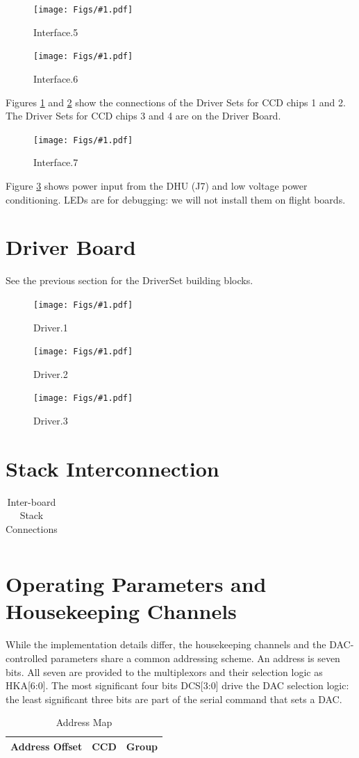 \documentclass[12pt]{article}
\let\oldsection\section
\renewcommand{\section}{\FloatBarrier\oldsection}
\newcommand{\schempage}[1]{
   \begin{center}
\begin{figure}[ht!]
   \centerline{\texttt{[image: Figs/\#1.pdf]}}
    \caption{#1}
    \label{#1}
    \end{figure}
\end{center}
}
\begin{document}
\schempage{Interface.5}
\schempage{Interface.6}
Figures \ref{Interface.5} and \ref{Interface.6} show the connections of the Driver Sets for CCD chips 1 and 2. The Driver Sets for CCD chips 3 and 4 are on the Driver Board.
\FloatBarrier
\schempage{Interface.7}
\FloatBarrier
Figure \ref{Interface.7} shows power input from the DHU (J7) and low voltage power conditioning. LEDs are for debugging: we will not install them on flight boards.

\section{Driver Board}
\label{Driver}
See the previous section for the DriverSet building blocks.
\schempage{Driver.1}
\schempage{Driver.2}
\schempage{Driver.3}

\section{Stack Interconnection}

\tiny{
    \begin{longtable}{|m{}|m{}|m{}|m{}|m{}|m{}|m{}|m{}|@{}m{0pt}@{}}
    \caption{Inter-board Stack Connections} \label{Stack} \\
    \hline
    
    \end{longtable}
}

\normalsize

\section{Operating Parameters and Housekeeping Channels}
\label{param}

While the implementation details differ, the housekeeping channels and the DAC-controlled parameters share a common addressing scheme. An address is seven bits. All seven are provided to the multiplexors and their selection logic as HKA[6:0]. The most significant four bits DCS[3:0] drive the DAC selection logic: the least significant three bits are part of the serial command that sets a DAC. 

\begin{table}[ht!]
\caption{Address Map}
\begin{center}
\begin{tabular}{|l|l|l|}
\hline
Address Offset & CCD & Group \\
\hline

\hline
\end{tabular}
\end{center}
\vspace{5pt}

\label{hkmap}
\end{table}
\end{document}
